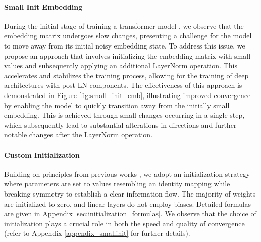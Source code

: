 \documentclass[11pt]{article}
\begin{document}
\paragraph{Small Init Embedding} \label{smallinit}

During the initial stage of training a transformer model \cite{vaswani2017attention}, we observe that the embedding matrix undergoes slow changes, presenting a challenge for the model to move away from its initial noisy embedding state. To address this issue, we propose an approach that involves initializing the embedding matrix with small values and subsequently applying an additional LayerNorm operation. This accelerates and stabilizes the training process, allowing for the training of deep architectures with post-LN components. The effectiveness of this approach is demonstrated in Figure \ref{fig:small_init_emb}, illustrating improved convergence by enabling the model to quickly transition away from the initially small embedding. This is achieved through small changes occurring in a single step, which subsequently lead to substantial alterations in directions and further notable changes after the LayerNorm operation.




\paragraph{Custom Initialization}

Building on principles from previous works \citep{he2016identity, af2_2021_nature}, we adopt an initialization strategy where parameters are set to values resembling an identity mapping while breaking symmetry to establish a clear information flow. The majority of weights are initialized to zero, and linear layers do not employ biases. Detailed formulas are given in Appendix \ref{sec:initialization_formulas}. We observe that the choice of initialization plays a crucial role in both the speed and quality of convergence (refer to Appendix \ref{appendix_smallinit} for further details).
\end{document}
